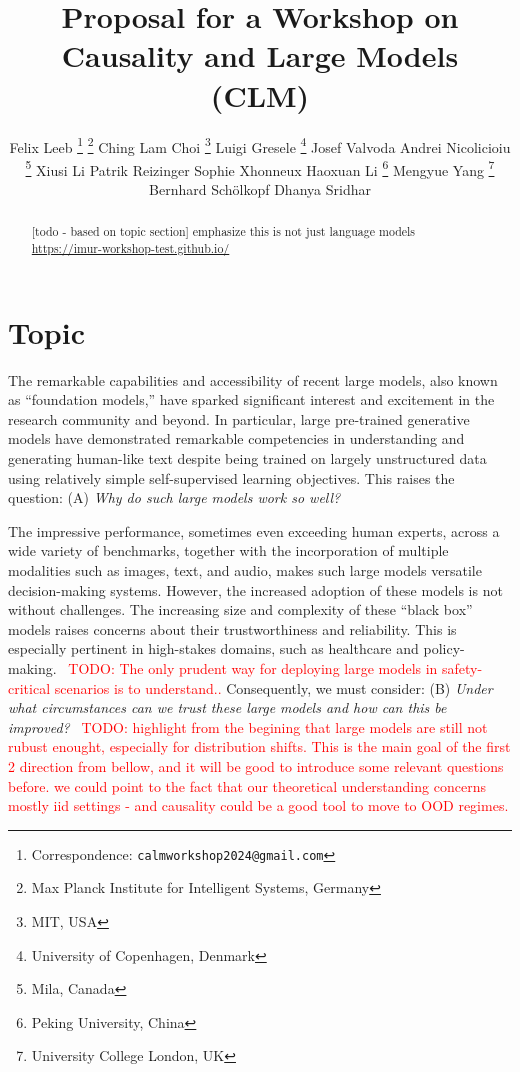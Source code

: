 \documentclass{article}
\title{Proposal for a Workshop on \\
Causality and Large Models (C\emoji{heart}LM)}
\author{%
    Felix Leeb \thanks{Correspondence: \texttt{calmworkshop2024@gmail.com}} 
    \thanks{Max Planck Institute for Intelligent Systems, Germany}
    \And
    Ching Lam Choi \footnotemark[1] \thanks{MIT, USA}
    \And
    Luigi Gresele \thanks{University of Copenhagen, Denmark}
    \And
    Josef Valvoda \footnotemark[4]
    \And
    Andrei Nicolicioiu \thanks{Mila, Canada}
    \And
    Xiusi Li \footnotemark[5]
    \And
    Patrik Reizinger \footnotemark[2]
    \And
    Sophie Xhonneux \footnotemark[5]
    \And
    Haoxuan Li \thanks{Peking University, China}
    \And
    Mengyue Yang \thanks{University College London, UK}
    \And
    Bernhard Schölkopf \footnotemark[2]
    \And
    Dhanya Sridhar \footnotemark[5]
}
\newcommand{\todo}[1]{\textcolor{red}{~TODO: #1}}
\begin{document}
\maketitle


\begin{abstract}
[todo - based on topic section] emphasize this is not just language models
\url{https://imur-workshop-test.github.io/}
\end{abstract}



\section{Topic}

The remarkable capabilities and accessibility of recent large models, also known as ``foundation models,'' have sparked significant interest and excitement in the research community and beyond. In particular, large pre-trained generative models have demonstrated remarkable competencies in understanding and generating human-like text despite being trained on largely unstructured data using relatively simple self-supervised learning objectives. This raises the question: (A) \textit{Why do such large models work so well?} %

The impressive performance, sometimes even exceeding human experts, across a wide variety of benchmarks, together with the incorporation of multiple modalities such as images, text, and audio, makes such large models versatile decision-making systems.
However, the increased adoption of these models is not without challenges. The increasing size and complexity of these ``black box'' models raises concerns about their trustworthiness and reliability.
This is especially pertinent in high-stakes domains, such as healthcare and policy-making. %
\todo{The only prudent way for deploying large models in safety-critical scenarios is to understand..}
Consequently, we must consider: (B) \textit{Under what circumstances can we trust these large models and how can this be improved?} %
\todo{highlight from the begining that large models are still not rubust enought, especially for distribution shifts. This is the main goal of the first 2 direction from bellow, and it will be good to introduce some relevant questions before. we could point to the fact that our theoretical understanding concerns mostly iid settings - and causality could be a good tool to move to OOD regimes.}
\end{document}
